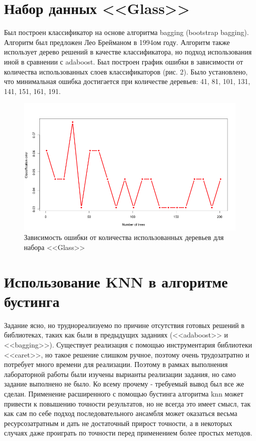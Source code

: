 \documentclass[]{article}
\numberwithin{equation}{section}
\begin{document}
    \section{Набор данных <<Glass>>}
    Был построен классификатор на основе алгоритма bagging (bootstrap bagging). Алгоритм был предложен Лео Брейманом в 1994ом году. Алгоритм также использует дерево решений в качестве классификатора, но подход использования иной в сравнении с adaboost. Был построен график ошибки в зависимости от количества использованных слоев классификаторов (рис. 2). Было установлено, что минимальная ошибка достигается при количестве деревьев: 41, 81, 101, 131, 141, 151, 161, 191.
    \begin{figure}[H]
        \centering
        \includegraphics[width = 0.9\linewidth]{data/Glass_num_trees.png}
        \caption{Зависимость ошибки от количества использованных деревьев для набора <<Glass>>}
    \end{figure}

    \section{Использование KNN в алгоритме бустинга}

    Задание ясно, но труднореализуемо по причине отсутствия готовых решений в библиотеках, таких как были в предыдущих заданиях (<<adaboost>> и <<bagging>>). Существует реализация с помощью инструментария библиотеки <<caret>>, но такое решение слишком ручное, поэтому очень трудозатратно и потребует много времени для реализации. Поэтому в рамках выполнения лабораторной работы были изучены вырианты реализации задания, но само задание выполнено не было. Ко всему прочему - требуемый вывод был все же сделан. Применение расширенного с помощью бустинга алгоритма knn может привести к повышению точности результатов, но не всегда это имеет смысл, так как сам по себе подход последовательного ансамбля может оказаться весьма ресурсозатратным и дать не достаточный прирост точности, а в некоторых случаях даже проиграть по точности перед применением более простых методов.
\end{document}
